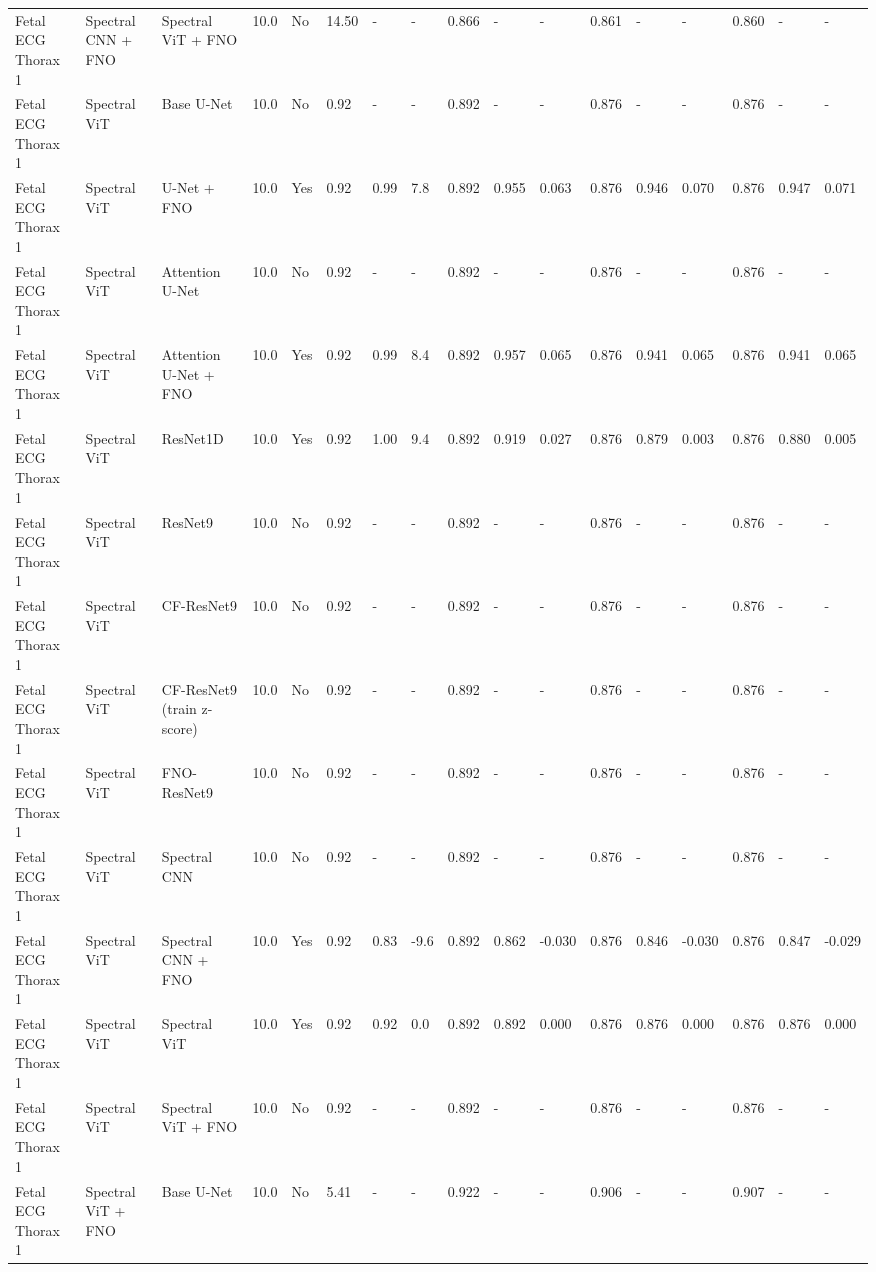 \begin{longtable}{lllllllllllllllll}
Fetal ECG Thorax 1 & Spectral CNN + FNO & Spectral ViT + FNO & 10.0 & No & 14.50 & - & - & 0.866 & - & - & 0.861 & - & - & 0.860 & - & - \\
Fetal ECG Thorax 1 & Spectral ViT & Base U-Net & 10.0 & No & 0.92 & - & - & 0.892 & - & - & 0.876 & - & - & 0.876 & - & - \\
Fetal ECG Thorax 1 & Spectral ViT & U-Net + FNO & 10.0 & Yes & 0.92 & 0.99 & 7.8 & 0.892 & 0.955 & 0.063 & 0.876 & 0.946 & 0.070 & 0.876 & 0.947 & 0.071 \\
Fetal ECG Thorax 1 & Spectral ViT & Attention U-Net & 10.0 & No & 0.92 & - & - & 0.892 & - & - & 0.876 & - & - & 0.876 & - & - \\
Fetal ECG Thorax 1 & Spectral ViT & Attention U-Net + FNO & 10.0 & Yes & 0.92 & 0.99 & 8.4 & 0.892 & 0.957 & 0.065 & 0.876 & 0.941 & 0.065 & 0.876 & 0.941 & 0.065 \\
Fetal ECG Thorax 1 & Spectral ViT & ResNet1D & 10.0 & Yes & 0.92 & 1.00 & 9.4 & 0.892 & 0.919 & 0.027 & 0.876 & 0.879 & 0.003 & 0.876 & 0.880 & 0.005 \\
Fetal ECG Thorax 1 & Spectral ViT & ResNet9 & 10.0 & No & 0.92 & - & - & 0.892 & - & - & 0.876 & - & - & 0.876 & - & - \\
Fetal ECG Thorax 1 & Spectral ViT & CF-ResNet9 & 10.0 & No & 0.92 & - & - & 0.892 & - & - & 0.876 & - & - & 0.876 & - & - \\
Fetal ECG Thorax 1 & Spectral ViT & CF-ResNet9 (train z-score) & 10.0 & No & 0.92 & - & - & 0.892 & - & - & 0.876 & - & - & 0.876 & - & - \\
Fetal ECG Thorax 1 & Spectral ViT & FNO-ResNet9 & 10.0 & No & 0.92 & - & - & 0.892 & - & - & 0.876 & - & - & 0.876 & - & - \\
Fetal ECG Thorax 1 & Spectral ViT & Spectral CNN & 10.0 & No & 0.92 & - & - & 0.892 & - & - & 0.876 & - & - & 0.876 & - & - \\
Fetal ECG Thorax 1 & Spectral ViT & Spectral CNN + FNO & 10.0 & Yes & 0.92 & 0.83 & -9.6 & 0.892 & 0.862 & -0.030 & 0.876 & 0.846 & -0.030 & 0.876 & 0.847 & -0.029 \\
Fetal ECG Thorax 1 & Spectral ViT & Spectral ViT & 10.0 & Yes & 0.92 & 0.92 & 0.0 & 0.892 & 0.892 & 0.000 & 0.876 & 0.876 & 0.000 & 0.876 & 0.876 & 0.000 \\
Fetal ECG Thorax 1 & Spectral ViT & Spectral ViT + FNO & 10.0 & No & 0.92 & - & - & 0.892 & - & - & 0.876 & - & - & 0.876 & - & - \\
Fetal ECG Thorax 1 & Spectral ViT + FNO & Base U-Net & 10.0 & No & 5.41 & - & - & 0.922 & - & - & 0.906 & - & - & 0.907 & - & - \\

\end{longtable}

